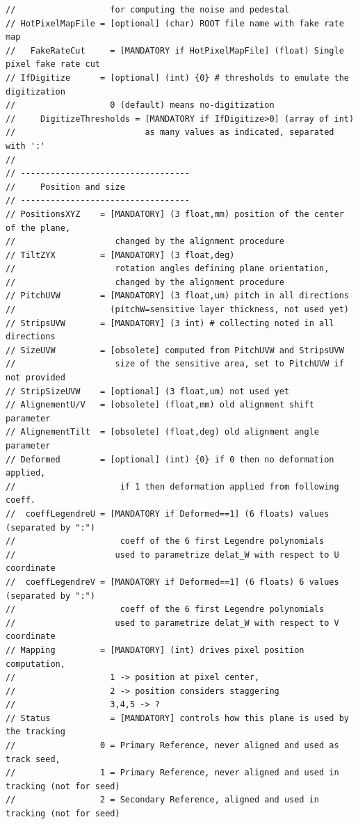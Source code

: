 \documentclass[a4paper, 12pt, twoside]{article}
\begin{document}
\begin{verbatim}
//                   for computing the noise and pedestal
// HotPixelMapFile = [optional] (char) ROOT file name with fake rate map
//   FakeRateCut     = [MANDATORY if HotPixelMapFile] (float) Single pixel fake rate cut
// IfDigitize      = [optional] (int) {0} # thresholds to emulate the digitization
//                   0 (default) means no-digitization
//     DigitizeThresholds = [MANDATORY if IfDigitize>0] (array of int)
//                          as many values as indicated, separated with ':'
//
// ----------------------------------
//     Position and size
// ----------------------------------
// PositionsXYZ    = [MANDATORY] (3 float,mm) position of the center of the plane,
//                    changed by the alignment procedure
// TiltZYX         = [MANDATORY] (3 float,deg)
//                    rotation angles defining plane orientation,
//                    changed by the alignment procedure
// PitchUVW        = [MANDATORY] (3 float,um) pitch in all directions
//                   (pitchW=sensitive layer thickness, not used yet)
// StripsUVW       = [MANDATORY] (3 int) # collecting noted in all directions
// SizeUVW         = [obsolete] computed from PitchUVW and StripsUVW
//                    size of the sensitive area, set to PitchUVW if not provided
// StripSizeUVW    = [optional] (3 float,um) not used yet
// AlignementU/V   = [obsolete] (float,mm) old alignment shift parameter
// AlignementTilt  = [obsolete] (float,deg) old alignment angle parameter
// Deformed        = [optional] (int) {0} if 0 then no deformation applied,
//                     if 1 then deformation applied from following coeff.
//  coeffLegendreU = [MANDATORY if Deformed==1] (6 floats) values (separated by ":")
//                     coeff of the 6 first Legendre polynomials
//                    used to parametrize delat_W with respect to U coordinate
//  coeffLegendreV = [MANDATORY if Deformed==1] (6 floats) 6 values (separated by ":")
//                     coeff of the 6 first Legendre polynomials
//                    used to parametrize delat_W with respect to V coordinate
// Mapping         = [MANDATORY] (int) drives pixel position computation,
//                   1 -> position at pixel center,
//                   2 -> position considers staggering
//                   3,4,5 -> ?
// Status            = [MANDATORY] controls how this plane is used by the tracking
//                 0 = Primary Reference, never aligned and used as track seed,
//                 1 = Primary Reference, never aligned and used in tracking (not for seed)
//                 2 = Secondary Reference, aligned and used in tracking (not for seed)

\end{verbatim}
\end{document}
